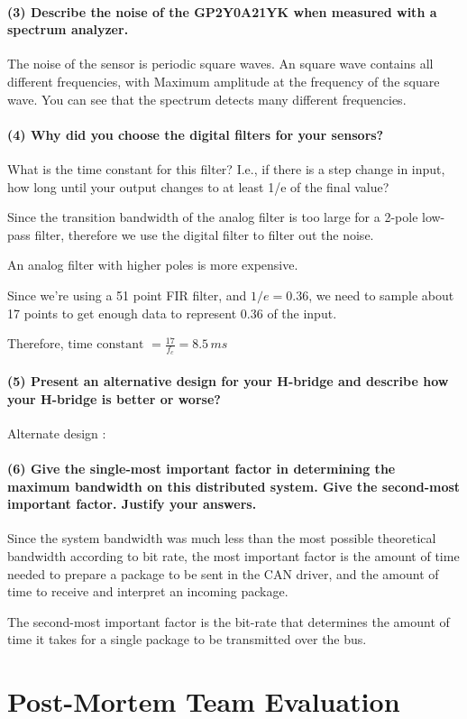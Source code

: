\documentclass[a4paper]{article}
\begin{document}
\paragraph{(3) Describe the noise of the \textbf{GP2Y0A21YK} when measured with a spectrum analyzer. \\ }

The noise of the sensor is periodic square waves. An square wave contains all different frequencies, with Maximum amplitude at the frequency of the square wave.
You can see that the spectrum detects many different frequencies.

\paragraph{(4) Why did you choose the digital filters for your sensors? \\ }
What is the time constant for this filter? I.e., if there is a step change in input, how long until your output changes to at least 1/e of the final value?

Since the transition bandwidth of the analog filter is too large for a 2-pole low-pass filter, therefore we use the digital filter to filter out the noise. 

An analog filter with higher poles is more expensive. 

Since we're using a 51 point FIR filter, and $1/e = 0.36$, we need to sample about 17 points to get enough data to represent 0.36 of the input. 

Therefore, $\text{time constant } = \frac{17}{f_c} = 8.5 \, ms$

\paragraph{(5) Present an alternative design for your H-bridge and describe how your H-bridge is better or worse? \\ }

Alternate design :

\paragraph{(6) Give the single-most important factor in determining the maximum bandwidth on this distributed system.
Give the second-most important factor. Justify your answers.  \\ }

Since the system bandwidth was much less than the most possible theoretical bandwidth according to bit rate, the most important factor is the amount of time needed to prepare a package to be sent in the CAN driver, and the amount of time to receive and interpret an incoming package.

The second-most important factor is the bit-rate that determines the amount of time it takes for a single package to be transmitted over the bus.

\section{Post-Mortem Team Evaluation}
\end{document}
